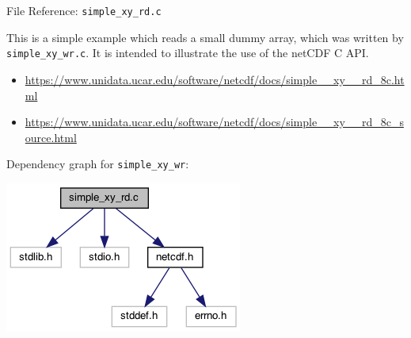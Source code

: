\documentclass[compress,11pt,xcolor=svgnames,aspectratio=169]{beamer}
\begin{document}
\begin{frame}[fragile]{File Reference: \texttt{simple\_xy\_rd.c}}

This is a simple example which reads a small dummy array, which was written by \verb|simple_xy_wr.c|. It is intended to illustrate the use of the netCDF C API.\\[0.3cm]

\begin{itemize}
  \item {\tiny \url{https://www.unidata.ucar.edu/software/netcdf/docs/simple__xy__rd_8c.html}}\\[0.3cm]
  \item {\tiny \url{https://www.unidata.ucar.edu/software/netcdf/docs/simple__xy__rd_8c_source.html}}\\[0.4cm]
\end{itemize}

Dependency graph for \verb|simple_xy_wr|:

\begin{center}
\includegraphics[scale=0.5]{fig/simple__xy__rd_8c__incl}
\end{center}

\end{frame}
\end{document}
